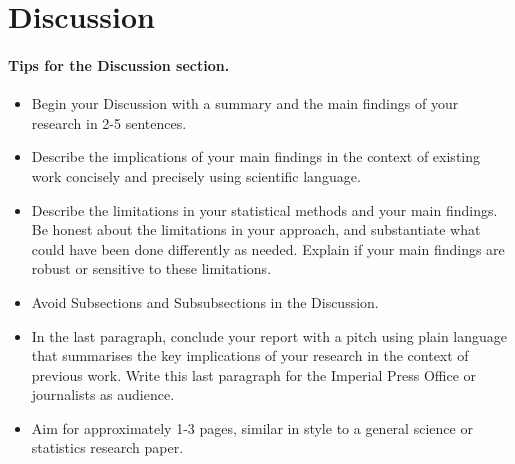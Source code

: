 \section{Discussion}

\paragraph{Tips for the Discussion section.} 

\begin{itemize}
    \item Begin your Discussion with a summary and the main findings of your research in 2-5 sentences.
    \item Describe the implications of your main findings in the context of existing work concisely and precisely using scientific language. 
    \item Describe the limitations in your statistical methods and your main findings. Be honest about the limitations in your approach, and substantiate what could have been done differently as needed. Explain if your main findings are robust or sensitive to these limitations.
    \item Avoid Subsections and Subsubsections in the Discussion.
    \item In the last paragraph, conclude your report with a pitch using plain language that summarises the key implications of your research in the context of previous work. Write this last paragraph for the Imperial Press Office or journalists as audience.
    \item Aim for approximately 1-3 pages, similar in style to a general science or statistics research paper.
\end{itemize}
